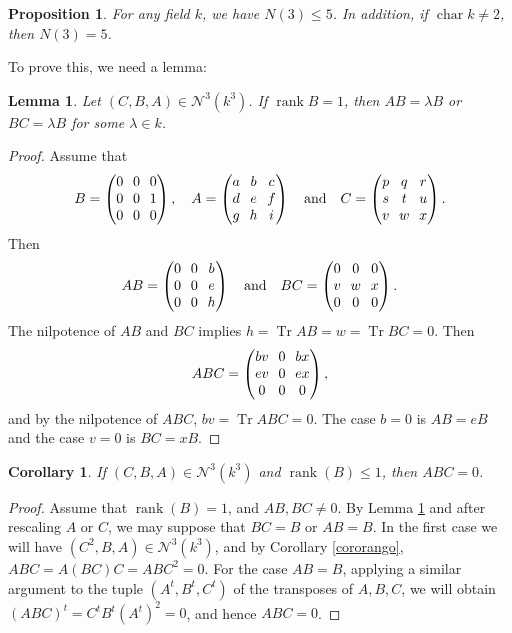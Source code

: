 \documentclass[JEP,XML,SOM,Unicode,NoEqCountersInSection]{cedram}
\let\mathcal\mathscr
\theoremstyle{plain}
\newtheorem{prop}[teo]{Proposition}
\newtheorem{lema}[teo]{Lemma}
\newtheorem{coro}[teo]{Corollary}
\theoremstyle{definition}
\DeclareMathOperator{\Char}{char}
\DeclareMathOperator{\rank}{rank}
\DeclareMathOperator{\Tr}{Tr}
\begin{document}
\begin{prop}\label{casotres}
For any field $k$, we have $N(3)\leq 5$. In addition, if $\Char{k}\neq 2$, then $N(3)=5$.
\end{prop}
To prove this, we need a lemma:
\begin{lema}\label{lema3}
Let $(C,B,A)\in \mathcal{N}^{3}(k^{3})$. If $\rank{B}=1$, then $AB=\lambda B$ or $BC=\lambda B$ for some $\lambda \in k$.
\end{lema}
\begin{proof}
Assume that
\[\arraycolsep3.5pt
B=\begin{pmatrix}
0 & 0 & 0\\
0 & 0 & 1\\
0 & 0 & 0\\
\end{pmatrix},\quad A=\begin{pmatrix}
a & b & c\\
d & e & f\\
g & h & i\\
\end{pmatrix}\quad\text{and}\quad C=\begin{pmatrix}
p & q & r\\
s & t & u\\
v & w & x\\
\end{pmatrix}. 
\]
Then
\[\arraycolsep3.5pt
AB=\begin{pmatrix}
0 & 0 & b\\
0 & 0 & e\\
0 & 0 & h\\
\end{pmatrix}\quad\text{and}\quad BC=\begin{pmatrix}
0 & 0 & 0\\
v & w & x\\
0 & 0 & 0\\
\end{pmatrix}.
\]
The nilpotence of $AB$ and $BC$ implies $h=\Tr{AB}=w=\Tr{BC}=0$. Then
\[\arraycolsep3.5pt
ABC=\begin{pmatrix}
bv & 0 & bx\\
ev & 0 & ex\\
0 & 0 & 0\\
\end{pmatrix},
\]
and by the nilpotence of $ABC$, $bv=\Tr{ABC}=0$.
The case $b=0$ is $AB=eB$ and the case $v=0$ is $BC=xB$.
\end{proof}

\begin{coro}\label{cororango3}
If $(C,B,A) \in \mathcal{N}^{3}(k^{3})$ and $\rank(B)\leq 1$, then $ABC=0$.
\end{coro}
\begin{proof}
Assume that $\rank(B)=1$, and $AB, BC\neq 0$. By Lemma \ref{lema3} and after rescaling $A$ or $C$, we may suppose that $BC=B$ or $AB=B$. In the first case we will have $(C^2,B,A) \in \mathcal{N}^{3}(k^{3})$, and by Corollary \ref{cororango}, $ABC=A(BC)C=ABC^{2}=0$. For the case $AB=B$, applying a similar argument to the tuple $(A^{t},B^{t},C^{t})$ of the transposes of $A,B,C$, we will obtain $(ABC)^{t}=C^{t}B^{t}(A^{t})^{2}=0$, and hence \hbox{$ABC=0$}.
\end{proof}
\end{document}
